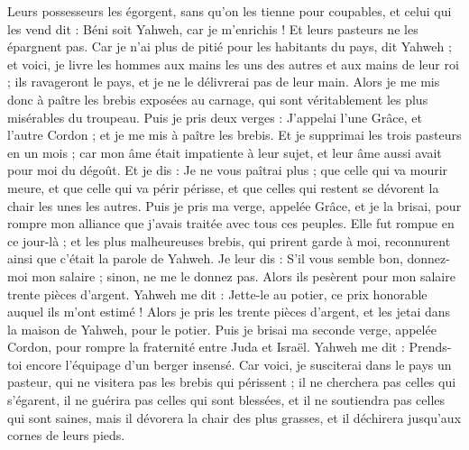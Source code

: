 \begin{multicols}{2}
Leurs possesseurs les égorgent, sans qu'on les tienne pour coupables, et celui qui les vend dit : Béni soit Yahweh, car je m’enrichis !  Et leurs pasteurs ne les épargnent pas.
Car je n’ai plus de pitié pour les habitants du pays, dit Yahweh ; et voici, je livre les hommes aux mains les uns des autres et aux mains de leur roi ; ils ravageront le pays, et je ne le délivrerai pas de leur main.
Alors je me mis donc à paître les brebis exposées au carnage, qui sont véritablement les plus misérables du troupeau. Puis je pris deux verges : J'appelai l'une Grâce, et l'autre Cordon ; et je me mis à paître les brebis.
Et je supprimai les trois pasteurs en un mois ; car mon âme était impatiente à leur sujet, et leur âme aussi avait pour moi du dégoût.
Et je dis : Je ne vous paîtrai plus ; que celle qui va mourir meure, et que celle qui va périr périsse, et que celles qui restent se dévorent la chair les unes les autres.
Puis je pris ma verge, appelée Grâce, et je la brisai, pour rompre mon alliance que j'avais traitée avec tous ces peuples.
Elle fut rompue en ce jour-là ; et les plus malheureuses brebis, qui prirent garde à moi, reconnurent ainsi que c'était la parole de Yahweh.
Je leur dis : S'il vous semble bon, donnez-moi mon salaire ; sinon, ne me le donnez pas.  Alors ils pesèrent  pour mon salaire trente pièces d'argent.
Yahweh me dit : Jette-le au potier, ce prix honorable auquel ils m’ont estimé ! Alors je pris les trente pièces d'argent, et les jetai dans la maison de Yahweh, pour le potier.
Puis je brisai ma seconde verge, appelée Cordon, pour rompre la fraternité entre Juda et Israël.
Yahweh me dit : Prends-toi encore l'équipage d'un berger insensé.
Car voici, je susciterai dans le pays un pasteur, qui ne visitera pas les brebis qui périssent ; il ne cherchera pas celles qui s’égarent, il ne guérira pas celles qui sont blessées, et il ne soutiendra pas celles qui sont saines, mais il dévorera la chair des plus grasses, et il déchirera jusqu’aux cornes de leurs pieds.

\end{multicols}
